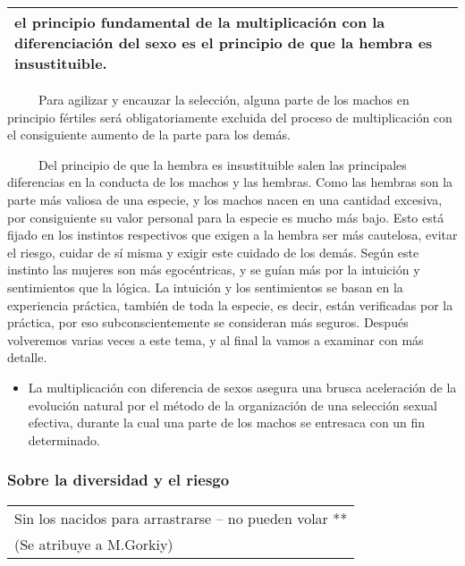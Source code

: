 \begin{longtable}[]{@{}l@{}}
\toprule
el principio fundamental de la multiplicación con la diferenciación del
sexo es el principio de que la hembra es insustituible.\tabularnewline
\bottomrule
\end{longtable}

~ ~ ~ Para agilizar y encauzar la selección, alguna parte de los machos
en principio fértiles será obligatoriamente excluida del proceso de
multiplicación con el consiguiente aumento de la parte para los demás.

~ ~ ~ Del principio de que la hembra es insustituible salen las
principales diferencias en la conducta de los machos y las hembras. Como
las hembras son la parte más valiosa de una especie, y los machos nacen
en una cantidad excesiva, por consiguiente su valor personal para la
especie es mucho más bajo. Esto está fijado en los instintos respectivos
que exigen a la hembra ser más cautelosa, evitar el riesgo, cuidar de sí
misma y exigir este cuidado de los demás. Según este instinto las
mujeres son más egocéntricas, y se guían más por la intuición y
sentimientos que la lógica. La intuición y los sentimientos se basan en
la experiencia práctica, también de toda la especie, es decir, están
verificadas por la práctica, por eso subconscientemente se consideran
más seguros. Después volveremos varias veces a este tema, y al final la
vamos a examinar con más detalle.

\begin{itemize}
\tightlist
\item
  La multiplicación con diferencia de sexos asegura una brusca
  aceleración de la evolución natural por el método de la organización
  de una selección sexual efectiva, durante la cual una parte de los
  machos se entresaca con un fin determinado.
\end{itemize}

\protect\hypertarget{M5}{}{}

\subsubsection{Sobre la diversidad y el
riesgo}\label{sobre-la-diversidad-y-el-riesgo}

\begin{longtable}[]{@{}l@{}}
\toprule
Sin los nacidos para arrastrarse -- no pueden volar **\tabularnewline
(Se atribuye a M.Gorkiy)\tabularnewline
\bottomrule
\end{longtable}

